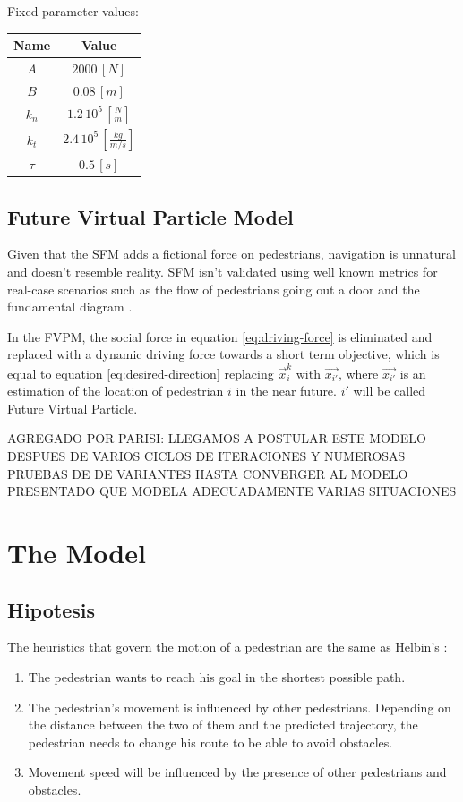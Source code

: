 \documentclass[english]{article}
\providecommand{\tabularnewline}{\\}
\begin{document}
Fixed parameter values:

\begin{center}
\begin{tabular}{|c|c|}
\hline 
Name  & Value\tabularnewline
\hline 
\hline 
$A$  & $2000\,[N]$\tabularnewline
\hline 
$B$  & $0.08\,[m]$\tabularnewline
\hline 
$k_{n}$  & $1.2\,10^{5}\,[\frac{N}{m}]$\tabularnewline
\hline 
$k_{t}$  & $2.4\,10^{5}\,[\frac{kg}{m/s}]$\tabularnewline
\hline 
$\tau$  & $0.5\,[s]$\tabularnewline
\hline 
\end{tabular}
\par\end{center}


\subsection{Future Virtual Particle Model}

Given that the SFM adds a fictional force on pedestrians, navigation
is unnatural and doesn't resemble reality. SFM isn't validated using
well known metrics for real-case scenarios such as the flow of pedestrians
going out a door and the fundamental diagram \cite{key-pari2009}.

In the FVPM, the social force in equation \ref{eq:driving-force}
is eliminated and replaced with a dynamic driving force towards a
short term objective, which is equal to equation \ref{eq:desired-direction}
replacing $\vec{x}_{i}^{k}$ with $\vec{x_{i'}}$, where $\vec{x_{i'}}$
is an estimation of the location of pedestrian $i$ in the near future.
$i'$ will be called Future Virtual Particle.

AGREGADO POR PARISI: LLEGAMOS A POSTULAR ESTE MODELO DESPUES DE VARIOS CICLOS DE ITERACIONES Y NUMEROSAS PRUEBAS DE DE VARIANTES HASTA CONVERGER AL MODELO PRESENTADO QUE MODELA ADECUADAMENTE VARIAS SITUACIONES

\section{The Model}


\subsection{Hipotesis}

The heuristics that govern the motion of a pedestrian are the same
as Helbin's \cite{key-helb1995,key-helb2000}:

\begin{enumerate}
    \item The pedestrian wants to reach his goal in the shortest possible path. 
    \item The pedestrian's movement is influenced by other pedestrians. Depending
    on the distance between the two of them and the predicted trajectory,
    the pedestrian needs to change his route to be able to avoid obstacles. 
    \item Movement speed will be influenced by the presence of other pedestrians
    and obstacles. 
\end{enumerate}
\end{document}
